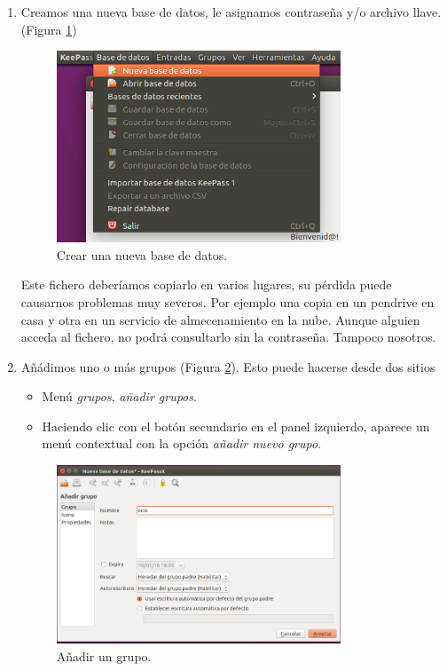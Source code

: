 \documentclass[a4paper,12pt]{article}
\begin{document}
    \begin{enumerate}
    \item
Creamos una nueva base de datos, le asignamos contraseña y/o archivo llave.
(Figura \ref{fig:crea_bd})
\begin{figure}[htpb]
  \centering
    \includegraphics[width=0.8\textwidth]{images/kee01}
  \caption{Crear una nueva base de datos.}
  \label{fig:crea_bd}
\end{figure}

Este fichero deberíamos copiarlo en varios lugares, su pérdida puede
causarnos problemas muy severos.  Por ejemplo una copia en un pendrive
en casa y otra en un servicio de almecenamiento en la nube. Aunque alguien
acceda al fichero, no podrá consultarlo sin la contraseña. Tampoco nosotros.
    \item
Añádimos uno o más grupos 
(Figura \ref{fig:crea_gr}). Esto puede hacerse desde dos sitios

\begin{itemize}
\item
Menú \emph{grupos}, \emph{añadir grupos}.

\item
Haciendo clic con el botón secundario en el panel izquierdo, aparece un menú
contextual con la opción \emph{añadir nuevo grupo}.
\end{itemize}

\begin{figure}[htpb]
  \centering
    \includegraphics[width=0.8\textwidth]{images/kee02}
  \caption{Añadir un grupo.}
  \label{fig:crea_gr}
\end{figure}




\end{enumerate}
\end{document}
